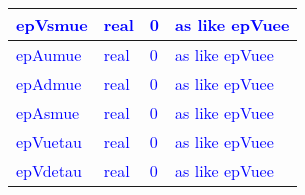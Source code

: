 \documentclass{article}
\begin{document}
\begin{longtable}{llll}
\midrule
\textcolor{blue}{epVsmue} & \begin{minipage}[t]{2cm}\textcolor{blue}{real}\end{minipage} & \begin{minipage}[t]{2cm}\textcolor{blue}{0}\end{minipage} & \begin{minipage}[t]{12cm}\textcolor{blue}{as like epVuee}\end{minipage}\\*
\midrule
\textcolor{blue}{epAumue} & \begin{minipage}[t]{2cm}\textcolor{blue}{real}\end{minipage} & \begin{minipage}[t]{2cm}\textcolor{blue}{0}\end{minipage} & \begin{minipage}[t]{12cm}\textcolor{blue}{as like epVuee}\end{minipage}\\*
\midrule
\textcolor{blue}{epAdmue} & \begin{minipage}[t]{2cm}\textcolor{blue}{real}\end{minipage} & \begin{minipage}[t]{2cm}\textcolor{blue}{0}\end{minipage} & \begin{minipage}[t]{12cm}\textcolor{blue}{as like epVuee}\end{minipage}\\*
\midrule
\textcolor{blue}{epAsmue} & \begin{minipage}[t]{2cm}\textcolor{blue}{real}\end{minipage} & \begin{minipage}[t]{2cm}\textcolor{blue}{0}\end{minipage} & \begin{minipage}[t]{12cm}\textcolor{blue}{as like epVuee}\end{minipage}\\*
\midrule
\textcolor{blue}{epVuetau} & \begin{minipage}[t]{2cm}\textcolor{blue}{real}\end{minipage} & \begin{minipage}[t]{2cm}\textcolor{blue}{0}\end{minipage} & \begin{minipage}[t]{12cm}\textcolor{blue}{as like epVuee}\end{minipage}\\*
\midrule
\textcolor{blue}{epVdetau} & \begin{minipage}[t]{2cm}\textcolor{blue}{real}\end{minipage} & \begin{minipage}[t]{2cm}\textcolor{blue}{0}\end{minipage} & \begin{minipage}[t]{12cm}\textcolor{blue}{as like epVuee}\end{minipage}\\*

\end{longtable}
\end{document}
